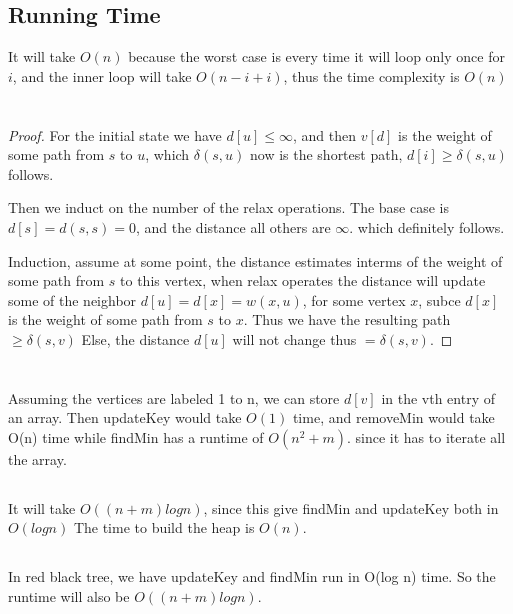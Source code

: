 \documentclass[a4paper]{article}
\begin{document}
\subsection{Running Time}
It will take $O(n)$ because the worst case is every time it will loop only once for $i$, and the inner loop will take $O(n-i+i)$, thus the time complexity is $O(n)$
\section{}
\begin{proof}
  For the initial state we have $d[u]\leq \infty$, and then $v[d]$ is the weight of some path from $s$ to $u$, which $\delta(s,u)$ now is the shortest path, $d[i]\geq\delta(s,u)$ follows.

  Then we induct on the number of the relax operations. The base case is $d[s]=d(s,s)=0$, and the distance all others are $\infty$. which definitely follows.

  Induction, assume at some point, the distance estimates interms of the weight of some path from $s$ to this vertex, when relax operates the distance will update some of the neighbor $d[u]=d[x]=w(x,u)$, for some vertex $x$, subce $d[x]$ is the weight of some path from $s$ to $x$. Thus  we have the resulting path $\geq \delta(s,v)$ Else, the distance $d[u]$ will not change thus $=\delta(s,v)$.
\end{proof}
\section{}
\subsection{}
Assuming the vertices are labeled 1 to n, we can store $d[v]$ in the vth entry of an array. Then updateKey would take $O(1)$ time, and removeMin would take O(n) time while findMin has a runtime of $O(n^2 + m)$. since it has to iterate all the array.
\subsection{}
It will take  $O((n + m) log n)$, since this give findMin and updateKey both in $O(log n)$ The time to build the heap is $O(n)$.
\subsection{}
In red black tree, we have updateKey and findMin run in O(log n) time. So the runtime will also be $O((n + m) log n)$.
\end{document}
